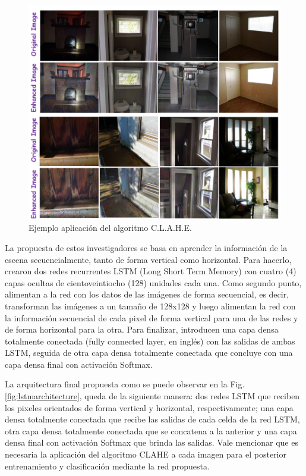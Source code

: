 \begin{figure}[h]
	\centering
	\includegraphics[width=1\linewidth, height=0.5\textheight]{images/lstm_clahe_example}
	\caption[Ejemplo aplicación del algoritmo C.L.A.H.E.]{Ejemplo aplicación del algoritmo C.L.A.H.E.}
	\label{fig:lstmclaheexample}
\end{figure}

La propuesta de estos investigadores se basa en aprender la información de la escena secuencialmente, tanto de forma vertical como horizontal. Para hacerlo, crearon dos redes recurrentes LSTM (Long Short Term Memory) con cuatro (4) capas ocultas de cientoveintiocho (128) unidades cada una. Como segundo punto, alimentan a la red con los datos de las imágenes de forma secuencial, es decir, transforman las imágenes a un tamaño de 128x128 y luego alimentan la red con la información secuencial de cada pixel de forma vertical para una de las redes y de forma horizontal para la otra. Para finalizar, introducen una capa densa totalmente conectada (fully connected layer, en inglés) con las salidas de ambas LSTM, seguida de otra capa densa totalmente conectada que concluye con una capa densa final con activación Softmax.

La arquitectura final propuesta como se puede observar en la Fig. \ref{fig:lstmarchitecture}, queda de la siguiente manera: dos redes LSTM que reciben los pixeles orientados de forma vertical y horizontal, respectivamente; una capa densa totalmente conectada que recibe las salidas de cada celda de la red LSTM, otra capa densa totalmente conectada que se concatena a la anterior y una capa densa final con activación Softmax que brinda las salidas.
Vale mencionar que es necesaria la aplicación del algoritmo CLAHE a cada imagen para el posterior entrenamiento y clasificación mediante la red propuesta.


